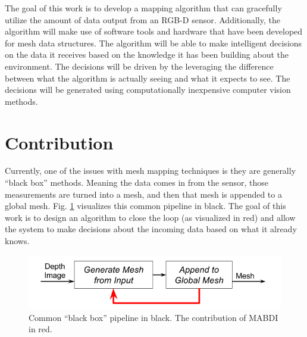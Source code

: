 The goal of this work is to develop a mapping algorithm that can gracefully
utilize the amount of data output from an RGB-D sensor. Additionally, the
algorithm will make use of software tools and hardware that have been developed
for mesh data structures. The algorithm will be able to make intelligent
decisions on the data it receives based on the knowledge it has been building
about the environment. The decisions will be driven by the leveraging the
difference between what the algorithm is actually seeing and what it expects to
see. The decisions will be generated using computationally inexpensive computer
vision methods.

\section{Contribution}

Currently, one of the issues with mesh mapping techniques is they are generally
``black box'' methods. Meaning the data comes in from the sensor, those
measurements are turned into a mesh, and then that mesh is appended to a global
mesh. Fig. \ref{fig:pipeline} visualizes this common pipeline in black. The goal
of this work is to design an algorithm to close the loop (as visualized in red)
and allow the system to make decisions about the incoming data based on what it
already knows.

\begin{figure}[h]%
\centering
  \includegraphics[width=.75\textwidth]{figures/diagram_general_pipeline.png}
  \caption{Common ``black box'' pipeline in black. The contribution of MABDI in red.}
  \label{fig:pipeline}
\end{figure}
